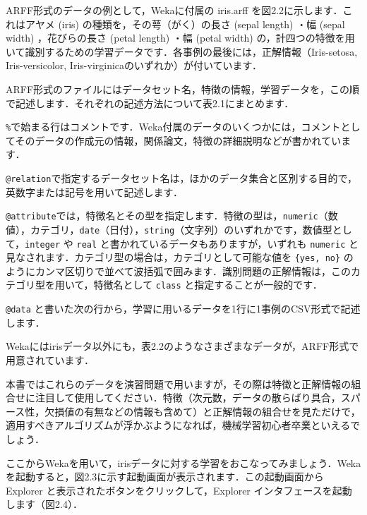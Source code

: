 ARFF形式のデータの例として，Wekaに付属の iris.arff を図2.2に示します．これはアヤメ (iris) の種類を，その萼（がく）の長さ (sepal length) ・幅 (sepal width) ，花びらの長さ (petal length) ・幅 (petal width) の，計四つの特徴を用いて識別するための学習データです．各事例の最後には，正解情報（Iris-setosa, Iris-versicolor, Iris-virginicaのいずれか）が付いています． 


ARFF形式のファイルにはデータセット名，特徴の情報，学習データを，この順で記述します．それぞれの記述方法について表2.1にまとめます．


{\tt \%}で始まる行はコメントです．Weka付属のデータのいくつかには，コメントとしてそのデータの作成元の情報，関係論文，特徴の詳細説明などが書かれています．

{\tt @relation}で指定するデータセット名は，ほかのデータ集合と区別する目的で，英数字または記号を用いて記述します．

{\tt @attribute}では，特徴名とその型を指定します．特徴の型は，{\tt numeric}（数値），カテゴリ，{\tt date}（日付），{\tt string}（文字列）のいずれかです，数値型として，{\tt integer} や {\tt real} と書かれているデータもありますが，いずれも {\tt numeric} と見なされます．カテゴリ型の場合は，カテゴリとして可能な値を {\tt \{yes, no\}} のようにカンマ区切りで並べて波括弧で囲みます．識別問題の正解情報は，このカテゴリ型を用いて，特徴名として {\tt class} と指定することが一般的です．

{\tt @data} と書いた次の行から，学習に用いるデータを1行に1事例のCSV形式で記述します．


Wekaにはirisデータ以外にも，表2.2のようなさまざまなデータが，ARFF形式で用意されています．


本書ではこれらのデータを演習問題で用いますが，その際は特徴と正解情報の組合せに注目して使用してください．特徴（次元数，データの散らばり具合，スパース性，欠損値の有無などの情報も含めて）と正解情報の組合せを見ただけで，適用すべきアルゴリズムが浮かぶようになれば，機械学習初心者卒業といえるでしょう．


ここからWekaを用いて，irisデータに対する学習をおこなってみましょう．Wekaを起動すると，図2.3に示す起動画面が表示されます．この起動画面から Explorer と表示されたボタンをクリックして，Explorer インタフェースを起動します（図2.4）．



